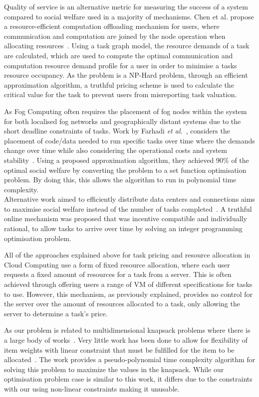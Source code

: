 Quality of service is an alternative metric for measuring the success of a system compared to social welfare used in a
majority of mechanisms. Chen et al. propose a resource-efficient computation offloading mechanism for users, where
communication and computation are joined by the node operation when allocating resources~\cite{8379445}. Using a task
graph model, the resource demands of a task are calculated, which are used to compute the optimal communication and
computation resource demand profile for a user in order to minimise a tasks resource occupancy. As the problem is a
NP-Hard problem, through an efficient approximation algorithm, a truthful pricing scheme is used to calculate the
critical value for the task to prevent users from misreporting task valuation.

As Fog Computing often requires the placement of fog nodes within the system for both localised fog networks and
geographically distant systems due to the short deadline constraints of tasks. Work by Farhadi \emph{et al.}~\cite{vaji_infocom}, considers
the placement of code/data needed to run specific tasks over time where the demands change over time while also
considering the operational costs and system stability~\cite{vaji_infocom}. Using a proposed approximation algorithm,
they achieved 90\% of the optimal social welfare by converting the problem to a set function optimisation problem. By
doing this, this allows the algorithm to run in polynomial time complexity. \\
Alternative work aimed to efficiently distribute data centers and connections aims to maximise social
welfare instead of the number of tasks completed~\cite{Bi2019}. A truthful online mechanism was proposed that was
incentive compatible and individually rational, to allow tasks to arrive over time by solving an integer programming
optimisation problem.

All of the approaches explained above for task pricing and resource allocation in Cloud Computing use a form of fixed
resource allocation, where each user requests a fixed amount of resources for a task from a server. This is often
achieved through offering users a range of VM of different specifications for tasks to use. However, this mechanism,
as previously explained, provides no control for the server over the amount of resources allocated to a task, only
allowing the server to determine a task's price.

As our problem is related to multidimensional knapsack problems where there is a large body of
works~\cite{knapsacks, numbers}. Very little work has been done to allow for flexibility of item weights with linear
constraint that must be fulfilled for the item to be allocated~\cite{Nip2017}. The work provides a pseudo-polynomial
time complexity algorithm for solving this problem to maximize the values in the knapsack. While our optimisation
problem case is similar to this work, it differs due to the constraints with our using non-linear constraints making
it unusable.
